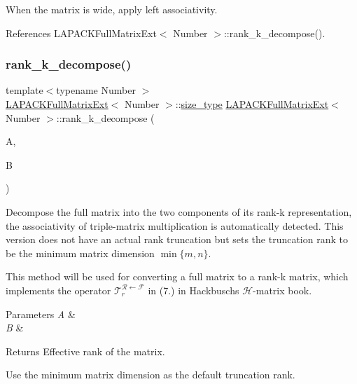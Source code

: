 When the matrix is wide, apply left associativity.

References L\+A\+P\+A\+C\+K\+Full\+Matrix\+Ext$<$ Number $>$\+::rank\+\_\+k\+\_\+decompose().

\mbox{\label{classLAPACKFullMatrixExt_af4406db24d0924c5f7e891336bfbcffe}} 
\subsubsection{\texorpdfstring{rank\+\_\+k\+\_\+decompose()}{rank\_k\_decompose()}\hspace{0.1cm}{\footnotesize\ttfamily [3/5]}}
{\footnotesize\ttfamily template$<$typename Number $>$ \\
\hyperlink{classLAPACKFullMatrixExt}{L\+A\+P\+A\+C\+K\+Full\+Matrix\+Ext}$<$ Number $>$\+::\hyperlink{classLAPACKFullMatrixExt_a5cf5f4a6104dc17029210b5ca52bf574}{size\+\_\+type} \hyperlink{classLAPACKFullMatrixExt}{L\+A\+P\+A\+C\+K\+Full\+Matrix\+Ext}$<$ Number $>$\+::rank\+\_\+k\+\_\+decompose (\begin{DoxyParamCaption}\item[{\hyperlink{classLAPACKFullMatrixExt}{L\+A\+P\+A\+C\+K\+Full\+Matrix\+Ext}$<$ Number $>$ \&}]{A,  }\item[{\hyperlink{classLAPACKFullMatrixExt}{L\+A\+P\+A\+C\+K\+Full\+Matrix\+Ext}$<$ Number $>$ \&}]{B }\end{DoxyParamCaption})}

Decompose the full matrix into the two components of its rank-\/k representation, the associativity of triple-\/matrix multiplication is automatically detected. This version does not have an actual rank truncation but sets the truncation rank to be the minimum matrix dimension $\min\{m, n\}$.


\begin{DoxyDescription}
\item[Note ]This method will be used for converting a full matrix to a rank-\/k matrix, which implements the operator $\mathcal{T}_{r}^{\mathcal{R} \leftarrow \mathcal{F}}$ in (7.) in Hackbusch\textquotesingle{}s $\mathcal{H}$-\/matrix book. 
\end{DoxyDescription}
\begin{DoxyParams}{Parameters}
{\em A} & \\
\hline
{\em B} & \\
\hline
\end{DoxyParams}
\begin{DoxyReturn}{Returns}
Effective rank of the matrix. 
\end{DoxyReturn}
Use the minimum matrix dimension as the default truncation rank.


